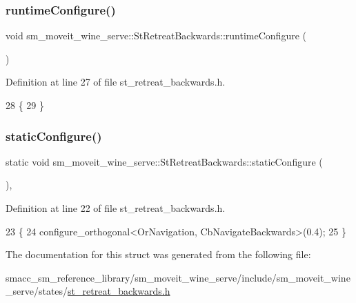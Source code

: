 \subsubsection{\texorpdfstring{runtime\+Configure()}{runtimeConfigure()}}
{\footnotesize\ttfamily void sm\+\_\+moveit\+\_\+wine\+\_\+serve\+::\+St\+Retreat\+Backwards\+::runtime\+Configure (\begin{DoxyParamCaption}{ }\end{DoxyParamCaption})\hspace{0.3cm}{\ttfamily [inline]}}



Definition at line 27 of file st\+\_\+retreat\+\_\+backwards.\+h.


\begin{DoxyCode}
28         \{
29         \}
\end{DoxyCode}
\mbox{\label{structsm__moveit__wine__serve_1_1StRetreatBackwards_ae65b8549b782863d6299761da24a49b1}} 
\subsubsection{\texorpdfstring{static\+Configure()}{staticConfigure()}}
{\footnotesize\ttfamily static void sm\+\_\+moveit\+\_\+wine\+\_\+serve\+::\+St\+Retreat\+Backwards\+::static\+Configure (\begin{DoxyParamCaption}{ }\end{DoxyParamCaption})\hspace{0.3cm}{\ttfamily [inline]}, {\ttfamily [static]}}



Definition at line 22 of file st\+\_\+retreat\+\_\+backwards.\+h.


\begin{DoxyCode}
23         \{
24             configure\_orthogonal<OrNavigation, CbNavigateBackwards>(0.4);
25         \}
\end{DoxyCode}


The documentation for this struct was generated from the following file\+:\begin{DoxyCompactItemize}
\item 
smacc\+\_\+sm\+\_\+reference\+\_\+library/sm\+\_\+moveit\+\_\+wine\+\_\+serve/include/sm\+\_\+moveit\+\_\+wine\+\_\+serve/states/\hyperlink{st__retreat__backwards_8h}{st\+\_\+retreat\+\_\+backwards.\+h}\end{DoxyCompactItemize}

